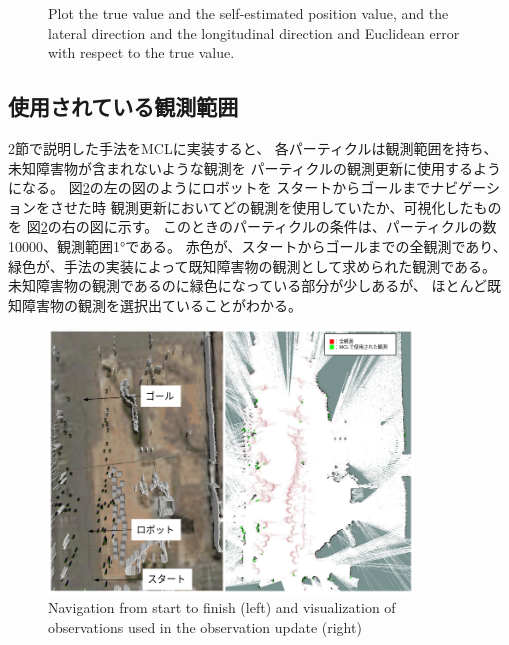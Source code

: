 \documentclass{jarticle}
\begin{document}
\begin{figure}[htbp]
\begin{center}
\begin{tabular}{cc}
  \end{tabular}
  \caption{
    Plot the true value and the self-estimated position value,
     and the lateral direction and the longitudinal 
    direction and Euclidean error with respect to the true value.}
  \label{fig: plot}
  \end{center}
\end{figure}

\subsection{使用されている観測範囲}

2節で説明した手法をMCLに実装すると、
各パーティクルは観測範囲を持ち、
未知障害物が含まれないような観測を
パーティクルの観測更新に使用するようになる。
図\ref{fig: スタートからゴールまでナビゲーション}の左の図のようにロボットを
スタートからゴールまでナビゲーションをさせた時
観測更新においてどの観測を使用していたか、可視化したものを
図\ref{fig: スタートからゴールまでナビゲーション}の右の図に示す。
このときのパーティクルの条件は、パーティクルの数10000、観測範囲1°である。
赤色が、スタートからゴールまでの全観測であり、
緑色が、手法の実装によって既知障害物の観測として求められた観測である。
未知障害物の観測であるのに緑色になっている部分が少しあるが、
ほとんど既知障害物の観測を選択出ていることがわかる。

\begin{figure}[t]
  \centering
   \includegraphics[height=70mm]{fig/particle_1000_observation_1_mcl.png}
   \vspace*{-4mm}
   \caption{Navigation from start to finish (left) and visualization of observations used in the observation update (right)}
   \label{fig: スタートからゴールまでナビゲーション}
\end{figure}

\end{document}
